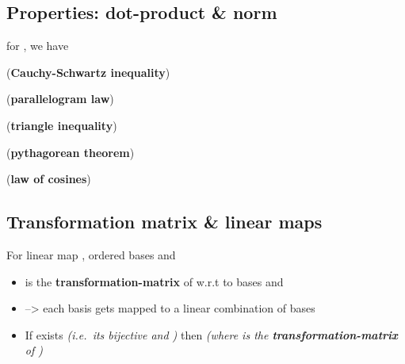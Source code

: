 \subsection*{Properties: dot-product \& norm}



for , we have

(\textbf{Cauchy-Schwartz inequality})

(\textbf{parallelogram law})

(\textbf{triangle inequality})

(\textbf{pythagorean theorem})

(\textbf{law of cosines})

\subsection*{Transformation matrix \& linear maps}


For linear map , ordered bases
and

\begin{itemize}

      \item
             is the
            \textbf{transformation-matrix} of  w.r.t to bases 
            and 
      \item
            --> each  basis gets mapped to a
            linear combination of  bases
      \item
            If  exists \emph{(i.e.~its bijective and )}
            then 
            \emph{(where  is the
                  \textbf{transformation-matrix} of )}
\end{itemize}

